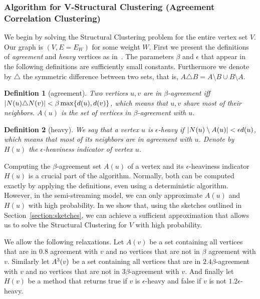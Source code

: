 \documentclass{article}
\newtheorem{definition}{Definition}[section]
\begin{document}
\subsubsection{Algorithm for V-Structural Clustering (Agreement Correlation Clustering)}\label{section:structural_properties}

We begin by solving the Structural Clustering problem for the entire vertex set $V$.
Our graph is $(V,E=E_W)$ for some weight $W$. First we present the definitions of \textit{agreement} and \textit{heavy} vertices as in~\cite{cohen2021correlation}. 
The parameters $\beta$ and $\epsilon$ that appear in the following definitions are sufficiently small constants. Furthermore we denote by $\triangle$ the symmetric difference between two sets, that is, $A \triangle B = A \setminus B \cup B \setminus A$.

\begin{definition}[agreement]
\label{definition:agreement}
Two vertices $u, v$ are in $\beta$-agreement iff $\left|N(u)\triangle N(v)\right| < \beta \max\{d(u), d(v)\}$, which means that $u, v$ share most of their neighbors. $A(u)$ is the set of vertices in $\beta$-agreement with $u$.
\end{definition}

\begin{definition}[heavy]
\label{definition:heavy}
We say that a vertex $u$ is $\epsilon$-heavy if $\left|N(u) \setminus A(u)\right| < \epsilon d(u)$, which means that most of its neighbors are in agreement with $u$. Denote by $H(u)$ the $\epsilon$-heaviness indicator of vertex $u$.
\end{definition}

Computing the $\beta$-agreement set $A(u)$ of a vertex and its $\epsilon$-heaviness indicator $H(u)$ is a crucial part of the algorithm. Normally, both can be computed exactly by applying the definitions, even using a deterministic algorithm. However, in the semi-streaming model, we can only approximate $A(u)$ and $H(u)$ with high probability. 
In  we show that, using the sketches outlined in Section~\ref{section:sketches}, we can achieve a sufficient approximation that allows us to solve the Structural Clustering for $V$ with high probability.

We allow the following relaxations. Let $A(v)$ be a set containing all vertices that are in $0.8$ agreement with $v$ and no vertices that are not in $\beta$ agreement with $v$. Similarly let $A^3(v)$ be a set containing all vertices that are in $2.4\beta$-agreement with $v$ and no vertices that are not in $3\beta$-agreement with $v$. And finally let $H(v)$ be a method that returns true if $v$ is $\epsilon$-heavy and false if $v$ is not $1.2\epsilon$-heavy.
\end{document}
